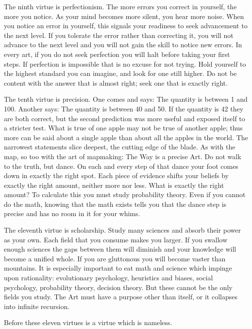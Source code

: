 {
 The ninth virtue is perfectionism. The more errors you correct in
yourself, the more you notice. As your mind becomes more silent, you
hear more noise. When you notice an error in yourself, this signals
your readiness to seek advancement to the next level. If you tolerate
the error rather than correcting it, you will not advance to the next
level and you will not gain the skill to notice new errors. In every
art, if you do not seek perfection you will halt before taking your
first steps. If perfection is impossible that is no excuse for not
trying. Hold yourself to the highest standard you can imagine, and look
for one still higher. Do not be content with the answer that is almost
right; seek one that is exactly right.}

{
 The tenth virtue is precision. One comes and says: The quantity is
between 1 and 100. Another says: The quantity is between 40 and 50. If
the quantity is 42 they are both correct, but the second prediction was
more useful and exposed itself to a stricter test. What is true of one
apple may not be true of another apple; thus more can be said about a
single apple than about all the apples in the world. The narrowest
statements slice deepest, the cutting edge of the blade. As with the
map, so too with the art of mapmaking: The Way is a precise Art. Do not
walk to the truth, but dance. On each and every step of that dance your
foot comes down in exactly the right spot. Each piece of evidence
shifts your beliefs by exactly the right amount, neither more nor less.
What is exactly the right amount? To calculate this you must study
probability theory. Even if you cannot do the math, knowing that the
math exists tells you that the dance step is precise and has no room in
it for your whims.}

{
 The eleventh virtue is scholarship. Study many sciences and absorb
their power as your own. Each field that you consume makes you larger.
If you swallow enough sciences the gaps between them will diminish and
your knowledge will become a unified whole. If you are gluttonous you
will become vaster than mountains. It is especially important to eat
math and science which impinge upon rationality: evolutionary
psychology, heuristics and biases, social psychology, probability
theory, decision theory. But these cannot be the only fields you study.
The Art must have a purpose other than itself, or it collapses into
infinite recursion.}

{
 Before these eleven virtues is a virtue which is nameless.}

